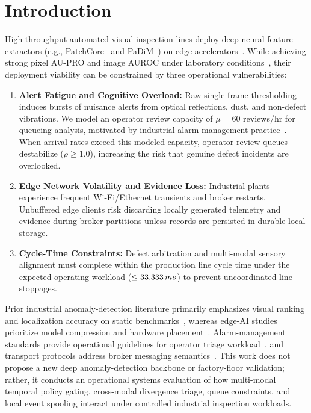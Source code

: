 \documentclass[conference]{IEEEtran}
\begin{document}
\section{Introduction}
High-throughput automated visual inspection lines deploy deep neural feature extractors (e.g., PatchCore~\cite{roth2022patchcore} and PaDiM~\cite{defard2021padim}) on edge accelerators~\cite{chen2021edge}. While achieving strong pixel AU-PRO and image AUROC under laboratory conditions~\cite{bergmann2021mvtec}, their deployment viability can be constrained by three operational vulnerabilities:

\begin{enumerate}\setlength{\topsep}{1.5pt}\setlength{\itemsep}{0pt}\setlength{\parsep}{0pt}\setlength{\parskip}{0pt}
\item \textbf{Alert Fatigue and Cognitive Overload:} Raw single-frame thresholding induces bursts of nuisance alerts from optical reflections, dust, and non-defect vibrations. We model an operator review capacity of $\mu = 60$ reviews/hr for queueing analysis, motivated by industrial alarm-management practice~\cite{isa182alarm}. When arrival rates exceed this modeled capacity, operator review queues destabilize ($\rho \ge 1.0$), increasing the risk that genuine defect incidents are overlooked.
    \item \textbf{Edge Network Volatility and Evidence Loss:} Industrial plants experience frequent Wi-Fi/Ethernet transients and broker restarts. Unbuffered edge clients risk discarding locally generated telemetry and evidence during broker partitions unless records are persisted in durable local storage.
    \item \textbf{Cycle-Time Constraints:} Defect arbitration and multi-modal sensory alignment must complete within the production line cycle time under the expected operating workload ($\le 33.333\,ms{}$) to prevent uncoordinated line stoppages.
\end{enumerate}

Prior industrial anomaly-detection literature primarily emphasizes visual ranking and localization accuracy on static benchmarks~\cite{roth2022patchcore,defard2021padim,bergmann2021mvtec}, whereas edge-AI studies prioritize model compression and hardware placement~\cite{chen2021edge}. Alarm-management standards provide operational guidelines for operator triage workload~\cite{isa182alarm}, and transport protocols address broker messaging semantics~\cite{mqttv5,sqlitewal}. This work does not propose a new deep anomaly-detection backbone or factory-floor validation; rather, it conducts an operational systems evaluation of how multi-modal temporal policy gating, cross-modal divergence triage, queue constraints, and local event spooling interact under controlled industrial inspection workloads.
\end{document}
